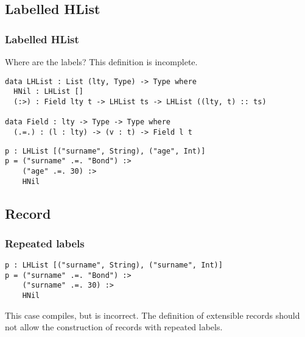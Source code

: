\documentclass{beamer}
\begin{document}
\subsection{Labelled HList}

\begin{frame}[fragile]
\frametitle{Labelled HList}

Where are the labels? This definition is incomplete.

\pause

\begin{definition}
\begin{verbatim}
data LHList : List (lty, Type) -> Type where
  HNil : LHList []
  (:>) : Field lty t -> LHList ts -> LHList ((lty, t) :: ts)

data Field : lty -> Type -> Type where
  (.=.) : (l : lty) -> (v : t) -> Field l t
\end{verbatim}
\end{definition}

\pause

\begin{example}
\begin{verbatim}
p : LHList [("surname", String), ("age", Int)]
p = ("surname" .=. "Bond") :> 
    ("age" .=. 30) :> 
    HNil
\end{verbatim}
\end{example}

\end{frame}

\subsection{Record}

\begin{frame}[fragile]
\frametitle{Repeated labels}

\begin{example}
\begin{verbatim}
p : LHList [("surname", String), ("surname", Int)]
p = ("surname" .=. "Bond") :> 
    ("surname" .=. 30) :> 
    HNil
\end{verbatim}
\end{example}

\pause

This case compiles, but is incorrect. The definition of extensible records should not allow the construction of records with repeated labels.

\end{frame}
\end{document}
